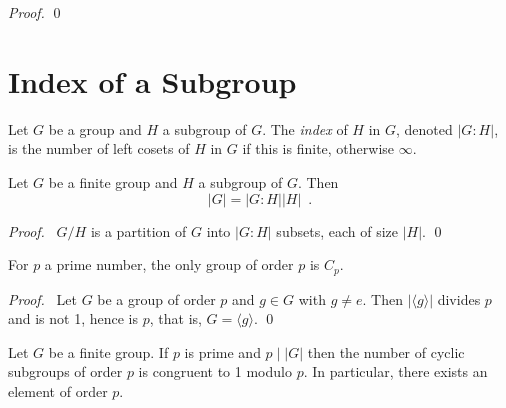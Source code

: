 \begin{proof}
\pf
{}
\qed
\end{proof}

\section{Index of a Subgroup}

\begin{df}[Index]
Let $G$ be a group and $H$ a subgroup of $G$. The \emph{index} of $H$ in $G$, denoted $|G:H|$, is the number of left cosets of $H$ in $G$ if this is finite, otherwise $\infty$.
\end{df}

\begin{thm}
Let $G$ be a finite group and $H$ a subgroup of $G$. Then
\[ |G| = |G : H| |H| \enspace . \]
\end{thm}

\begin{proof}
\pf\ $G/H$ is a partition of $G$ into $|G:H|$ subsets, each of size $|H|$. \qed
\end{proof}

\begin{cor}
For $p$ a prime number, the only group of order $p$ is $C_p$.
\end{cor}

\begin{proof}
\pf\ Let $G$ be a group of order $p$ and $g \in G$ with $g \neq e$. Then $|\langle g \rangle|$ divides $p$ and is not 1, hence is $p$, that is, $G = \langle g \rangle$. \qed
\end{proof}

\begin{thm}
Let $G$ be a finite group. If $p$ is prime and $p \mid |G|$ then the number of cyclic subgroups of order $p$ is congruent to 1 modulo $p$. In particular, there exists an element of order $p$.
\end{thm}

